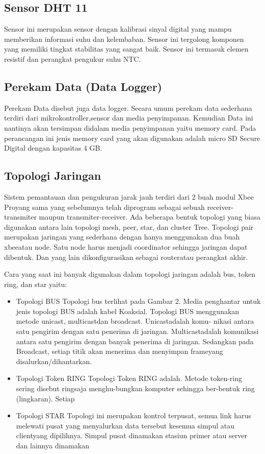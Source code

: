 \subsection{Sensor DHT 11}
Sensor ini merupakan sensor dengan kalibrasi sinyal digital yang mampu memberikan informasi suhu dan kelembaban. Sensor ini tergolong komponen yang memiliki tingkat stabilitas yang sangat baik. Sensor ini termasuk elemen resistif dan perangkat pengukur suhu NTC.

\subsection{Perekam Data (Data Logger)}
Perekam Data disebut juga data logger. Secara umum perekam data sederhana terdiri dari mikrokontroller,sensor dan media penyimpanan. Kemudian Data ini nantinya akan
tersimpan didalam media penyimpanan yaitu memory card. Pada perancangan ini jenis memory card yang akan digunakan adalah micro SD 
Secure Digital dengan kapasitas 4 GB.

\subsection{Topologi Jaringan}
Sistem pemantauan dan pengukuran jarak jauh terdiri dari 2 buah modul 
Xbee Proyang sama yang sebelumnya telah diprogram sebagai sebuah receiver-transmiter maupun transmiter-receiver. Ada beberapa bentuk topologi yang biasa digunakan antara lain topologi mesh, peer, star, dan cluster Tree.
Topologi pair merupakan jaringan yang sederhana dengan hanya menggunakan dua buah xbeeatau node. Satu node harus menjadi coordinator sehingga jaringan dapat dibentuk. Dan yang lain dikonfigurasikan sebagai routeratau perangkat akhir.

Cara yang saat ini banyak digunakan  dalam topologi jaringan adalah bus, token ring, dan star yaitu:
\begin{itemize}
\item Topologi BUS 
Topologi bus terlihat pada Gambar 2. Media penghantar untuk jenis topologi BUS adalah kabel Koaksial. Topologi BUS menggunakan metode unicast, multicastdan broadcast. Unicastadalah komu- nikasi antara satu pengirim 
dengan satu penerima di jaringan. Multicastadalah komunikasi antara satu pengirim dengan banyak penerima di jaringan. Sedangkan pada Broadcast, setiap titik akan menerima dan menyimpan frameyang disalurkan/dihantarkan.

\item Topologi Token RING 
Topologi Token RING adalah. Metode token-ring sering disebut ringsaja menghu-bungkan komputer sehingga ber-bentuk ring (lingkaran). Setiap 

\item Topologi STAR 
Topologi ini merupakan kontrol terpusat, semua link harus melewati pusat yang menyalurkan data tersebut kesemua simpul atau clientyang dipilihnya. Simpul pusat dinamakan stasiun primer atau 
server dan lainnya dinamakan 

\end{itemize}
